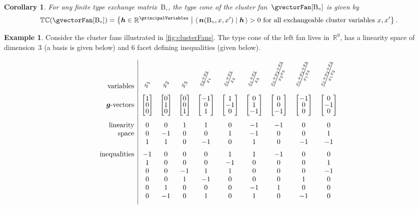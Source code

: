 \documentclass{amsart}
\newtheorem{corollary}[theorem]{Corollary}
\theoremstyle{definition}
\newtheorem{example}[theorem]{Example}
\newcommand{\R}{\mathbb{R}} %
\renewcommand{\b}[1]{{\boldsymbol{#1}}} %
\newcommand{\set}[2]{\left\{ #1 \;\middle|\; #2 \right\}} %
\newcommand{\dotprod}[2]{\left\langle \, #1 \; \middle| \; #2 \, \right\rangle} %
\newcommand{\compactVector}[3]{\begin{bmatrix} #1 \\[-.1cm] #2 \\[-.1cm] #3 \end{bmatrix}}
\newcommand{\typeCone}{\mathbb{TC}} %
\newcommand{\B}{\mathrm{B}} %
\begin{document}
\begin{corollary}
\label{coro:typeConeCA}
For any finite type exchange matrix~$\B_\circ$, the type cone of the cluster fan~$\gvectorFan[\B_\circ]$ is given by
\[
\typeCone(\gvectorFan[\B_\circ]) = \set{\b{h} \in \R^{\principalVariables}}{\dotprod{\b{n}(\B_\circ, x, x')}{\b{h}} > 0 \text{ for all exchangeable cluster variables } x, x'}.
\]
\end{corollary}

\begin{example}
Consider the cluster fans illustrated in \cref{fig:clusterFans}.
The type cone of the left fan lives in~$\R^9$, has a linearity space of dimension~$3$ (a basis is given below) and $6$ facet defining inequalities (given below). 

\[
\begin{array}{r|ccccccccc}
\text{variables} & \rotatebox{70}{$x_1$} & \rotatebox{70}{$x_2$} & \rotatebox{70}{$x_3$} & \rotatebox{70}{$\frac{x_2 + x_3}{x_1}$} & \rotatebox{70}{$\frac{x_1 + x_3}{x_2}$} & \rotatebox{70}{$\frac{x_1 + x_2}{x_3}$} & \rotatebox{70}{$\frac{x_1 + x_2 + x_3}{x_2 x_3}$} & \rotatebox{70}{$\frac{x_1 + x_2 + x_3}{x_1 x_3}$} & \rotatebox{70}{$\frac{x_1 + x_2 + x_3}{x_1 x_2}$} \\[.2cm]
\text{$\b{g}$-vectors} & \compactVector{1}{0}{0} & \compactVector{0}{1}{0} & \compactVector{0}{0}{1} & \compactVector{-1}{0}{1} & \compactVector{1}{-1}{0} & \compactVector{0}{1}{-1} & \compactVector{0}{0}{-1} & \compactVector{-1}{0}{0} & \compactVector{0}{-1}{0} \\[.6cm]
\text{linearity}	& 0 & 0 & 1 & 1 & 0 & -1 & -1 & 0 & 0 \\
\text{space}		& 0 & -1 & 0 & 0 & 1 & -1 & 0 & 0 & 1 \\
					& 1 & 1 & 0 & -1 & 0 & 1 & 0 & -1 & -1 \\[.2cm]
\text{inequalities} & -1 & 0 & 0 & 0 & 1 & 1 & -1 & 0 & 0 \\
 					& 1 & 0 & 0 & 0 & -1 & 0 & 0 & 0 & 1 \\
 					& 0 & 0 & -1 & 1 & 1 & 0 & 0 & 0 & -1 \\
 					& 0 & 0 & 1 & -1 & 0 & 0 & 0 & 1 & 0 \\
 					& 0 & 1 & 0 & 0 & 0 & -1 & 1 & 0 & 0 \\
 					& 0 & -1 & 0 & 1 & 0 & 1 & 0 & -1 & 0 \\[.2cm]
\end{array}
\]


\end{example}
\end{document}
